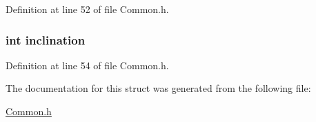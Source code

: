 Definition at line 52 of file Common.\+h.

\hypertarget{struct_tracking_data_af308b9934394c8bcf7614eb1df2d863f}{
\subsubsection[{inclination}]{\setlength{\rightskip}{0pt plus 5cm}int inclination}}\label{struct_tracking_data_af308b9934394c8bcf7614eb1df2d863f}


Definition at line 54 of file Common.\+h.



The documentation for this struct was generated from the following file\+:\begin{DoxyCompactItemize}
\item 
\hyperlink{_common_8h}{Common.\+h}\end{DoxyCompactItemize}
